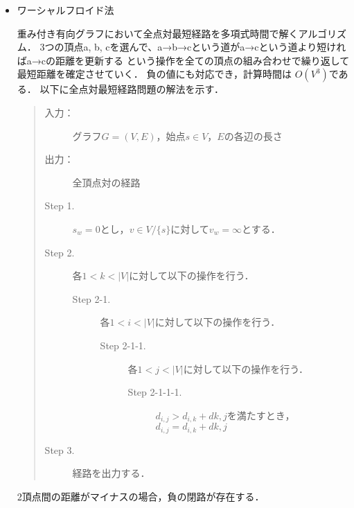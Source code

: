 \documentclass[12pt]{optlab-bachelor}
\begin{document}
\begin{itemize}
  \item ワーシャルフロイド法

  重み付き有向グラフにおいて全点対最短経路を多項式時間で解くアルゴリズム．
  3つの頂点a, b, cを選んで、a→b→cという道がa→cという道より短ければa→cの距離を更新する
  という操作を全ての頂点の組み合わせで繰り返して最短距離を確定させていく．
  負の値にも対応でき，計算時間は $O(V^3)$である．
  以下に全点対最短経路問題の解法を示す．

  \begin{quote}
    \begin{description}
      \item[入力：] グラフ$G=(V,E)$，始点$s \in V$，$E$の各辺の長さ
      \item[出力：] 全頂点対の経路
      \item[Step 1.] $s_w = 0$とし，$v \in V/\{s\}$に対して$v_w = \infty$とする．
      \item[Step 2.] 各$1<k<|V|$に対して以下の操作を行う．
      \begin{description}
        \item[Step 2-1.] 各$1<i<|V|$に対して以下の操作を行う．
        \begin{description}
          \item[Step 2-1-1.] 各$1<j<|V|$に対して以下の操作を行う．
          \begin{description}
            \item[Step 2-1-1-1.] $d_{i,j} > d_{i,k} + d{k,j}$を満たすとき，
            $d_{i,j} = d_{i,k} + d{k,j}$
          \end{description}
        \end{description}
      \end{description}

      \item[Step 3.] 経路を出力する．
    \end{description}
  \end{quote}
  2頂点間の距離がマイナスの場合，負の閉路が存在する．
\end{itemize}
\end{document}
